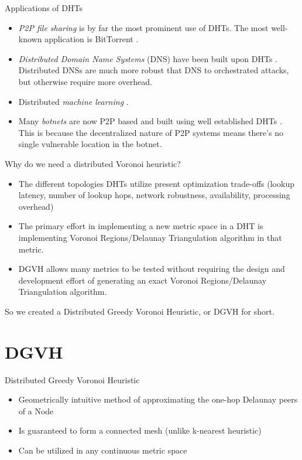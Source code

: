 \documentclass[8pt]{beamer}
\begin{document}
	\begin{frame}{Applications of DHTs}
		\begin{itemize}
			\item \textit{P2P file sharing} is by far the most prominent use of DHTs.  
			The most well-known application is BitTorrent \cite{bittorrent}.
			\item \textit{Distributed Domain Name Systems} (DNS) have been built upon DHTs \cite{cox2002serving} \cite{pappas2006comparative}.
			Distributed DNSs are much more robust that DNS to orchestrated attacks, but otherwise require more overhead.
			\item Distributed \textit{machine learning} \cite{liparameter}.
			\item Many \textit{botnets} are now P2P based and built using well established DHTs \cite{saad2011detecting}. 
			This is because the decentralized nature of P2P systems means there's no single vulnerable location in the botnet.
		\end{itemize}
	\end{frame}



\begin{frame}{Why do we need a distributed Voronoi heuristic?}
	\begin{itemize}
		\item The different topologies DHTs utilize present optimization trade-offs (lookup latency, number of lookup hops, network robustness, availability, processing overhead)
		\item The primary effort in implementing a new metric space in a DHT is implementing Voronoi Regions/Delaunay Triangulation algorithm in that metric.
		\item DGVH allows many metrics to be tested without requiring the design and development effort of generating an exact Voronoi Regions/Delaunay Triangulation algorithm.
	\end{itemize}
	
	So we created a Distributed Greedy Voronoi Heuristic, or DGVH for short.
\end{frame}



	

	
\section{DGVH}
	\begin{frame}{Distributed Greedy Voronoi Heuristic}
		\begin{itemize}
			\item Geometrically intuitive method of approximating the one-hop Delaunay peers of a Node
			\item Is guaranteed to form a connected mesh (unlike k-nearest heuristic)
			\item Can be utilized in any continuous metric space
		\end{itemize}
		
	\end{frame}
	
\end{document}
